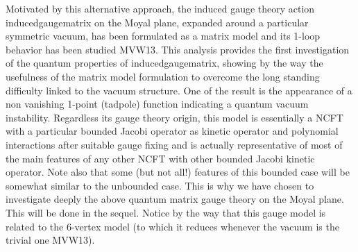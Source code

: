 \documentclass[10pt]{book}
\theoremstyle{break}
\begin{document}
Motivated by this alternative approach, the induced gauge theory action {inducedgaugematrix} on the Moyal plane, expanded around a particular symmetric vacuum, has been formulated as a matrix model and its 1-loop behavior has been studied {MVW13}. This analysis provides the first investigation of the quantum properties of {inducedgaugematrix}, showing by the way the usefulness of the matrix model formulation to overcome the long standing difficulty linked to the vacuum structure. One of the result is the appearance of a non vanishing 1-point (tadpole) function indicating a quantum vacuum instability. Regardless its gauge theory origin, this model is essentially a NCFT with a particular bounded Jacobi operator as kinetic operator and polynomial interactions after suitable gauge fixing and is actually representative of most of the main features of any other NCFT with other bounded Jacobi kinetic operator. Note also that some (but not all!) features of this bounded case will be somewhat similar 
to the unbounded case. This is why we have chosen to investigate deeply the above quantum matrix gauge theory on the Moyal plane. This will be done in the sequel. Notice by the way that this gauge model is related to the 6-vertex model (to which it reduces whenever the vacuum is the trivial one {MVW13}).\par 
\end{document}
